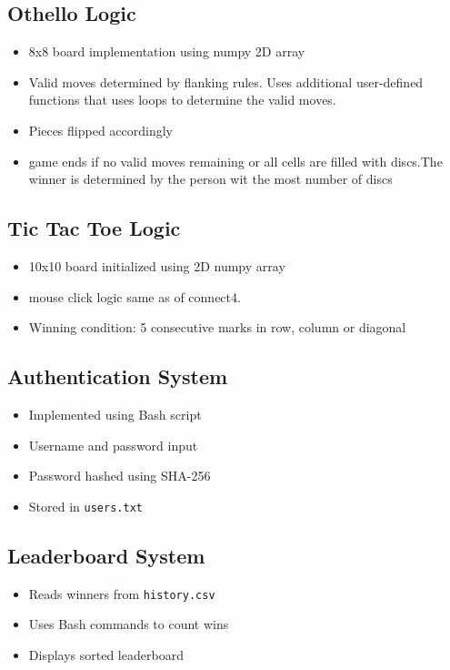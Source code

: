 \documentclass[12pt]{article}
\begin{document}
\subsection{Othello Logic}

\begin{itemize}
    \item 8x8 board implementation using numpy 2D array
    \item Valid moves determined by flanking rules. Uses additional user-defined functions that uses loops to determine the valid moves.
    \item Pieces flipped accordingly
	\item game ends if no valid moves remaining or all cells are filled with discs.The winner is determined by the person wit the most number of discs
\end{itemize}

\subsection{Tic Tac Toe Logic}

\begin{itemize}
    \item 10x10 board initialized using 2D numpy array
	\item mouse click logic same as of connect4.
    \item Winning condition: 5 consecutive marks in row, column or diagonal
\end{itemize}

\subsection{Authentication System}

\begin{itemize}
    \item Implemented using Bash script
    \item Username and password input
    \item Password hashed using SHA-256
    \item Stored in \texttt{users.txt}
\end{itemize}

\subsection{Leaderboard System}

\begin{itemize}
    \item Reads winners from \texttt{history.csv}
    \item Uses Bash commands to count wins
    \item Displays sorted leaderboard
\end{itemize}
\end{document}
